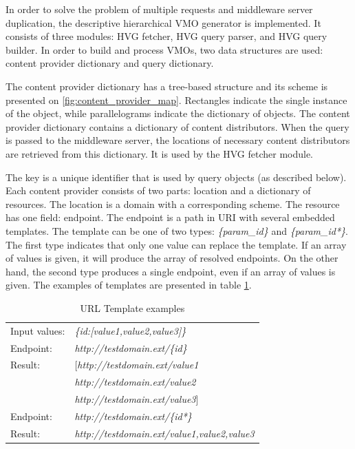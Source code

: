 In order to solve the problem of multiple requests and middleware server duplication, the descriptive hierarchical VMO generator is implemented. It consists of three modules: HVG fetcher, HVG query parser, and HVG query builder. In order to build and process VMOs, two data structures are used: content provider dictionary and query dictionary. 

The content provider dictionary has a tree-based structure and its scheme is presented on \ref{fig:content_provider_map}. Rectangles indicate the single instance of the object, while parallelograms indicate the dictionary of objects. The content provider dictionary contains a dictionary of content distributors. When the query is passed to the middleware server, the locations of necessary content distributors are retrieved from this dictionary. It is used by the HVG fetcher module.

The key is a unique identifier that is used by query objects (as described below). Each content provider consists of two parts: location and a dictionary of resources. The location is a domain with a corresponding scheme. The resource has one field: endpoint. The endpoint is a path in URI with several embedded templates. The template can be one of two types: \textit{\{param\_id\}} and \textit{\{param\_id*\}}. The first type indicates that only one value can replace the template. If an array of values is given, it will produce the array of resolved endpoints. On the other hand, the second type produces a single endpoint, even if an array of values is given. The examples of templates are presented in table \ref{table:template_replacement}.


\begin{table}
	 \begin{center}
	  \begin{tabular}{l l}
	    Input values: & \textit{\{id:[value1,value2,value3]\}} \\
	    Endpoint: & \textit{http://testdomain.ext/\{id\}}  \\ 
	    Result: & [\textit{http://testdomain.ext/value1}   \\
	    		&  \textit{http://testdomain.ext/value2}   \\
	    		&  \textit{http://testdomain.ext/value3}]  \\
	    Endpoint: & \textit{http://testdomain.ext/\{id*\}} \\
	    Result: &  \textit{http://testdomain.ext/value1,value2,value3}
	  \end{tabular}
	 \label{table:template_replacement}
	 \caption{URL Template examples}
	\end{center}
\end{table}

